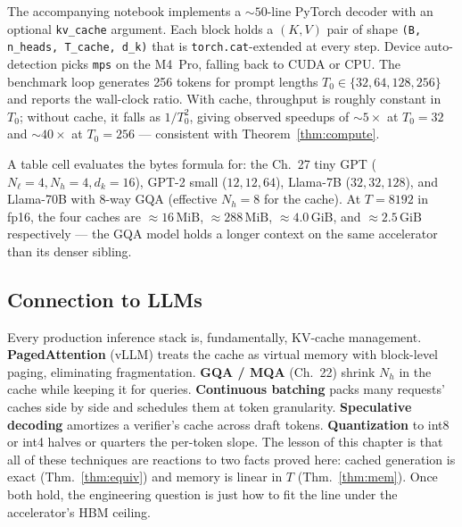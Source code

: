 The accompanying notebook implements a $\sim 50$-line PyTorch decoder with an optional \texttt{kv\_cache} argument. Each block holds a $(K, V)$ pair of shape \texttt{(B, n\_heads, T\_cache, d\_k)} that is \texttt{torch.cat}-extended at every step. Device auto-detection picks \texttt{mps} on the M4~Pro, falling back to CUDA or CPU. The benchmark loop generates 256 tokens for prompt lengths $T_0 \in \{32, 64, 128, 256\}$ and reports the wall-clock ratio. With cache, throughput is roughly constant in $T_0$; without cache, it falls as $1/T_0^2$, giving observed speedups of $\sim 5\times$ at $T_0 = 32$ and $\sim 40\times$ at $T_0 = 256$ --- consistent with Theorem~\ref{thm:compute}.

\begin{example}
A table cell evaluates the bytes formula for: the Ch.~27 tiny GPT (\(N_\ell=4, N_h=4, d_k=16\)), GPT-2 small (\(12, 12, 64\)), Llama-7B (\(32, 32, 128\)), and Llama-70B with 8-way GQA (effective \(N_h=8\) for the cache). At $T=8192$ in fp16, the four caches are \(\approx 16\,\mathrm{MiB}\), \(\approx 288\,\mathrm{MiB}\), \(\approx 4.0\,\mathrm{GiB}\), and \(\approx 2.5\,\mathrm{GiB}\) respectively --- the GQA model holds a longer context on the same accelerator than its denser sibling.
\end{example}

\subsection*{Connection to LLMs}

Every production inference stack is, fundamentally, KV-cache management. \textbf{PagedAttention} (vLLM) treats the cache as virtual memory with block-level paging, eliminating fragmentation. \textbf{GQA / MQA} (Ch.~22) shrink $N_h$ in the cache while keeping it for queries. \textbf{Continuous batching} packs many requests' caches side by side and schedules them at token granularity. \textbf{Speculative decoding} amortizes a verifier's cache across draft tokens. \textbf{Quantization} to int8 or int4 halves or quarters the per-token slope. The lesson of this chapter is that all of these techniques are reactions to two facts proved here: cached generation is exact (Thm.~\ref{thm:equiv}) and memory is linear in $T$ (Thm.~\ref{thm:mem}). Once both hold, the engineering question is just how to fit the line under the accelerator's HBM ceiling.
